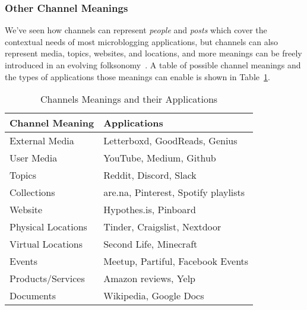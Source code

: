 
\subsubsection{Other Channel Meanings}

We've seen how channels can represent \emph{people} and \emph{posts}
which cover the contextual needs of most microblogging applications,
but channels can also represent media, topics, websites, and locations,
and more meanings can be freely introduced in an evolving folksonomy~\cite{folksonomy}.
A table of possible channel meanings and the types of applications
those meanings can enable is shown in Table~\ref{concepts:channels-and-applications}.


\begin{table}[h]
\small
\caption{Channels Meanings and their Applications}
\label{concepts:channels-and-applications}
\centering
\begin{tabular}{|l|l|}
\hline
\textbf{Channel Meaning} & \textbf{Applications} \\ \hline
External Media & Letterboxd, GoodReads, Genius \\ \hline
User Media & YouTube, Medium, Github \\ \hline
Topics & Reddit, Discord, Slack \\ \hline
Collections & are.na, Pinterest, Spotify playlists \\ \hline
Website & Hypothes.is, Pinboard \\ \hline
Physical Locations & Tinder, Craigslist, Nextdoor \\ \hline
Virtual Locations & Second Life, Minecraft \\ \hline
Events & Meetup, Partiful, Facebook Events \\ \hline
Products/Services & Amazon reviews, Yelp \\ \hline
Documents & Wikipedia, Google Docs \\ \hline
\end{tabular}
\end{table}

